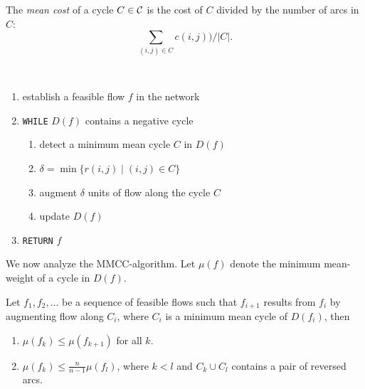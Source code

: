   The \emph{mean cost} of a cycle $C \in \mathcal{C}$ is the cost of $C$
  divided by the number of arcs in $C$:
  \begin{displaymath}
    \sum_{(i,j) \in C} c{(i,j)})  / |C|.
  \end{displaymath}
  

  \begin{algorithm}
    \label{alg:2}
    ~\\
    \begin{enumerate}
    \item establish a feasible flow $f$ in the network
    \item {\tt WHILE} $D(f)$ contains a negative cycle
      \begin{enumerate}
      \item  detect a minimum mean cycle $C$ in $D(f)$ 
      \item   $\delta=\min\{r{(i,j)} \mid (i,j) \in C\}$
      \item   augment $\delta$ units of flow along the cycle $C$
      \item   update $D(f)$ 
      \end{enumerate}
    \item {\tt RETURN} $f$
    \end{enumerate}
  \end{algorithm}



  We now analyze the MMCC-algorithm. Let $\mu(f)$ denote the minimum
  mean-weight of a cycle in $D(f)$. 
  
  \begin{lemma}
    \label{lem:8}
    Let $f_1,f_2,\ldots$ be a sequence of feasible flows such that
    $f_{i+1}$ results from $f_i$ by augmenting flow along $C_i$, where
    $C_i$ is a minimum mean cycle of $D(f_i)$, then
    \begin{enumerate}
    \item \label{item:5} $\mu(f_k)\leq\mu(f_{k+1})$ for all $k$.
    \item \label{item:6} $\mu(f_k) \leq \frac{n}{n-1} \mu(f_l)$, where $k<l$
      and $C_k \cup C_l$ contains a pair of reversed arcs.
    \end{enumerate}
  \end{lemma}




